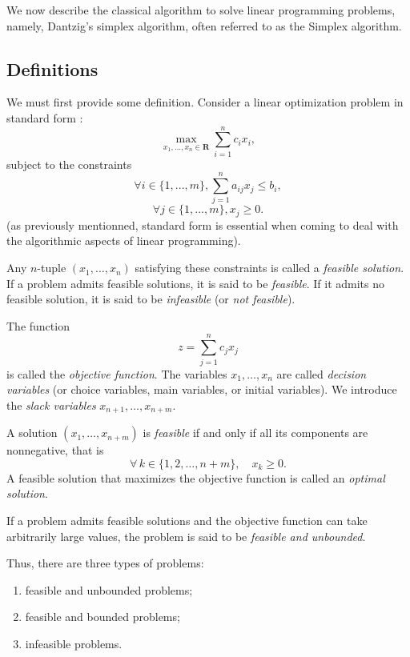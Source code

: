 We now describe the classical algorithm to solve linear programming problems, namely, Dantzig's simplex algorithm, often referred to as the Simplex algorithm.

\subsection{Definitions}

We must first provide some definition. Consider a linear optimization problem in standard form : 
\[
    \max_{x_1, ..., x_n \in \mathbf R}\sum_{i=1}^n c_i x_i,
\]
subject to the constraints
\[
    \forall i \in \{ 1, ..., m \}, \sum_{j=1}^n a_{ij} x_j \leqslant b_i,
\]
\[
    \forall j \in \{ 1, ..., m \}, x_j \geqslant 0.
\]
(as previously mentionned, standard form is essential when coming to deal with the algorithmic aspects of linear programming).

\begin{definition}
    Any $n$-tuple $(x_1,\dots,x_n)$ satisfying these constraints is called a \emph{feasible solution}.
    If a problem admits feasible solutions, it is said to be \emph{feasible}.
    If it admits no feasible solution, it is said to be \emph{infeasible} (or \emph{not feasible}).
\end{definition}

\begin{definition}
    The function
    \[
    z = \sum_{j=1}^n c_j x_j
    \]
    is called the \emph{objective function}.
    The variables $x_1,\dots,x_n$ are called \emph{decision variables} (or choice variables, main variables, or initial variables).
    We introduce the \emph{slack variables} $x_{n+1},\dots,x_{n+m}$.
\end{definition}

\begin{remark}
A solution $(x_1,\dots,x_{n+m})$ is \emph{feasible} if and only if all its components are nonnegative, that is
\[
   \forall\,k\in\{1,2,\dots,n+m\},\quad x_k \ge 0 .
\]
A feasible solution that maximizes the objective function is called an \emph{optimal solution}.
\end{remark}

\begin{definition}
    If a problem admits feasible solutions and the objective function can take arbitrarily large values, the problem is said to be \emph{feasible and unbounded}.
\end{definition}

\begin{remark}
    Thus, there are three types of problems:
    \begin{enumerate}
        \item feasible and unbounded problems;
        \item feasible and bounded problems;
        \item infeasible problems.
    \end{enumerate}
\end{remark}

